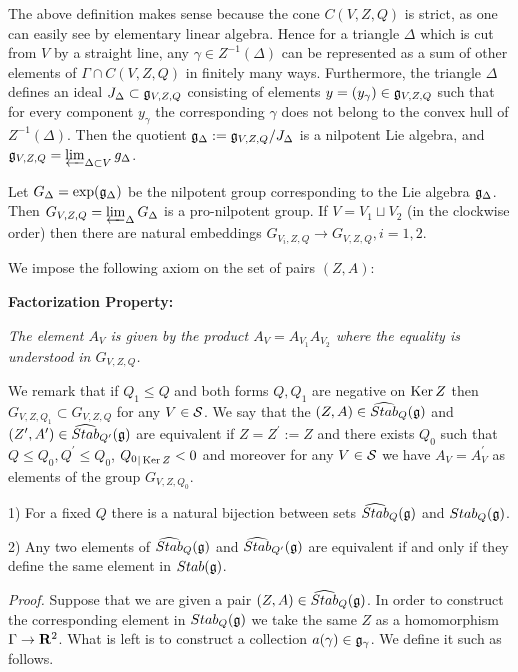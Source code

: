 \documentclass[12pt]{article}
\begin{document}
The above definition makes sense because the cone $C(V,Z,Q)$ is strict, as one can easily see
by elementary linear algebra.
Hence for a triangle $\Delta$ which is cut from $V$ by a straight line,  any $\gamma\in Z^{-1}(\Delta)$ can be represented as a sum of other elements
of $\Gamma\cap C(V,Z,Q)$ in finitely many ways.
Furthermore, the triangle $\Delta$ defines an ideal $J_{\Delta}\subset {\mathfrak g}_{V,Z,Q}$ consisting
of elements $y=(y_{\gamma})\in {\mathfrak g}_{V,Z,Q}$ such that for every component $y_{\gamma}$
the corresponding $\gamma$ does not belong to the convex hull
of $Z^{-1}(\Delta)$. Then the quotient ${\mathfrak g}_{\Delta}:={\mathfrak g}_{V,Z,Q}/J_{\Delta}$ is a  nilpotent
Lie algebra, and ${\mathfrak g}_{V,Z,Q}=\varprojlim_{\Delta\subset V}g_{\Delta}$.

Let $G_{\Delta}=\exp({\mathfrak g}_{\Delta})$ be the nilpotent  group corresponding to the Lie algebra ${\mathfrak g}_{\Delta}$. 
Then $G_{V,Z,Q}=\varprojlim_{\Delta}G_{\Delta}$ is a pro-nilpotent group.
If $V=V_1\sqcup V_2$ (in the clockwise order) then there are natural embeddings
$G_{V_i,Z,Q}\to G_{V,Z,Q}, i=1,2$.

We impose the following axiom on the set of pairs $(Z,A)$:

{\bf Factorization Property:}

{\it The element $A_V$ is given by the product
$A_V=A_{V_1}A_{V_2}$ where the equality is understood in $G_{V,Z,Q}$.}







We remark
that if $Q_1\le Q$ and both forms $Q,Q_1$ are negative on $\operatorname{Ker}Z $ 
then $G_{V,Z,Q_1}\subset G_{V,Z,Q}$ for any $V\in {\cal S}$.
We say that the $(Z,A)\in \widehat{Stab}_Q({\mathfrak g}) $ and $(Z^{\prime},A^{\prime})\in \widehat{Stab}_{Q^{\prime}}({\mathfrak g})$ are equivalent if
$Z=Z^{\prime}:=Z$ and there exists $Q_0$ such that $Q\le Q_0, Q^{\prime}\le Q_0$, ${Q_0}_{|\operatorname{Ker}Z}<0$ and 
moreover for any $V\in {\cal S}$ we have $A_V=A^{\prime}_V$  as elements of the group
$G_{V,Z,Q_0}$.

\begin{thm} 1) For a fixed $Q$ there is a natural bijection between sets $\widehat{Stab}_Q({\mathfrak g})$
and ${Stab}_Q({\mathfrak g})$.

2) Any two elements of $\widehat{Stab}_Q({\mathfrak g})$ and $\widehat{Stab}_{Q^{\prime}}({\mathfrak g})$ are equivalent if and only if they define  the same element in $Stab({\mathfrak g})$.
\end{thm}

{\it Proof.} Suppose that we are given a pair $(Z,A)\in \widehat{Stab}_Q({\mathfrak g})$. In order to construct
the corresponding element in $Stab_Q({\mathfrak g})$ we take the same $Z$ as a homomorphism $\Gamma\to {\bf R}^2$. 
What is left is to construct a collection
$a({\gamma})\in {\mathfrak g}_{\gamma}$. We define it such as follows.
\end{document}
